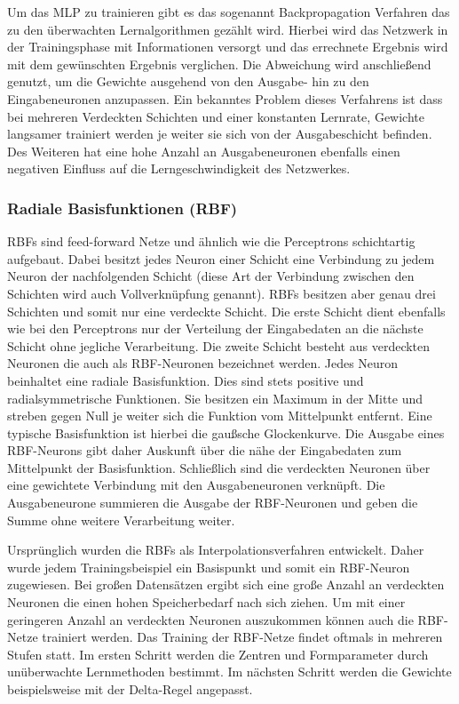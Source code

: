 Um das MLP zu trainieren gibt es das sogenannt Backpropagation Verfahren das zu den überwachten Lernalgorithmen gezählt wird. Hierbei wird das Netzwerk in der Trainingsphase mit Informationen versorgt und das errechnete Ergebnis wird mit dem gewünschten Ergebnis verglichen. Die Abweichung wird anschließend genutzt, um die Gewichte ausgehend von den Ausgabe- hin zu den Eingabeneuronen anzupassen. Ein bekanntes Problem dieses Verfahrens ist dass bei mehreren Verdeckten Schichten und einer konstanten Lernrate, Gewichte langsamer trainiert werden je weiter sie sich von der Ausgabeschicht befinden. Des Weiteren hat eine hohe Anzahl an Ausgabeneuronen ebenfalls einen negativen Einfluss auf die Lerngeschwindigkeit des Netzwerkes.


\subsubsection{Radiale Basisfunktionen (RBF)}

RBFs sind feed-forward Netze und ähnlich wie die Perceptrons schichtartig aufgebaut. Dabei besitzt jedes Neuron einer Schicht eine Verbindung zu jedem Neuron der nachfolgenden Schicht (diese Art der Verbindung zwischen den Schichten wird auch Vollverknüpfung genannt). RBFs besitzen aber genau drei Schichten und somit nur eine verdeckte Schicht. Die erste Schicht dient ebenfalls wie bei den Perceptrons nur der Verteilung der Eingabedaten an die nächste Schicht ohne jegliche Verarbeitung. Die zweite Schicht besteht aus verdeckten Neuronen die auch als RBF-Neuronen bezeichnet werden. Jedes Neuron beinhaltet eine radiale Basisfunktion. Dies sind stets positive und radialsymmetrische Funktionen. Sie besitzen ein Maximum in der Mitte und streben gegen Null je weiter sich die Funktion vom Mittelpunkt entfernt. Eine typische Basisfunktion ist hierbei die gaußsche Glockenkurve. Die Ausgabe eines RBF-Neurons gibt daher Auskunft über die nähe der Eingabedaten zum Mittelpunkt der Basisfunktion. Schließlich sind die verdeckten Neuronen über eine gewichtete Verbindung mit den Ausgabeneuronen verknüpft. Die Ausgabeneurone summieren die Ausgabe der RBF-Neuronen und geben die Summe ohne weitere Verarbeitung weiter.

Ursprünglich wurden die RBFs als Interpolationsverfahren entwickelt. Daher wurde jedem Trainingsbeispiel ein Basispunkt und somit ein RBF-Neuron zugewiesen. Bei großen Datensätzen ergibt sich eine große Anzahl an verdeckten Neuronen die einen hohen Speicherbedarf nach sich ziehen. Um mit einer geringeren Anzahl an verdeckten Neuronen auszukommen können auch die RBF-Netze trainiert werden. Das Training der RBF-Netze findet oftmals in mehreren Stufen statt. Im ersten Schritt werden die Zentren und Formparameter durch unüberwachte Lernmethoden bestimmt. Im nächsten Schritt werden die Gewichte beispielsweise mit der Delta-Regel angepasst.

